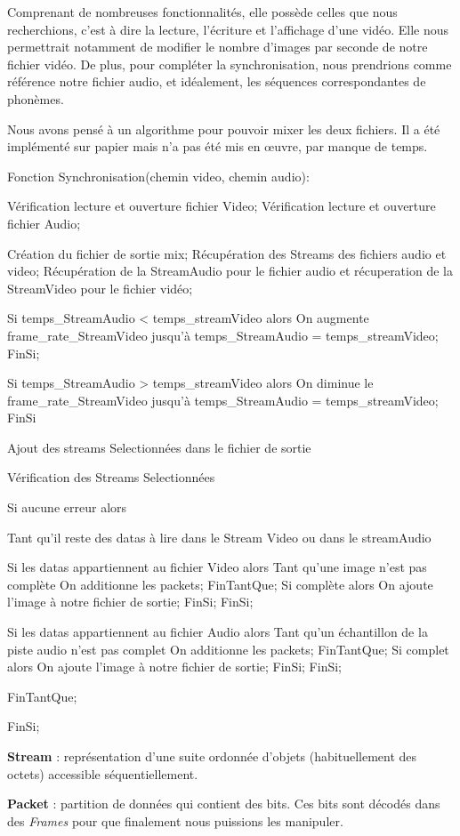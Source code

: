 Comprenant de nombreuses fonctionnalités, elle possède celles que nous recherchions, c'est à dire la lecture, l'écriture et l'affichage d’une vidéo. Elle nous permettrait notamment de modifier le nombre d'images par seconde de notre fichier vidéo. De plus, pour compléter la synchronisation, nous prendrions comme référence notre fichier audio, et idéalement, les séquences correspondantes de phonèmes.

Nous avons pensé à un algorithme pour pouvoir mixer les deux fichiers. Il a été implémenté sur papier mais n'a pas été mis en œuvre, par manque de temps.

\begin{verbnobox}[\small]

Fonction Synchronisation(chemin video, chemin audio):

Vérification lecture et ouverture fichier Video;
Vérification lecture et ouverture  fichier Audio;

Création du fichier de sortie mix;
Récupération des Streams des fichiers audio et video;
Récupération de la StreamAudio pour le fichier audio et récuperation de la StreamVideo pour le fichier vidéo;

Si temps_StreamAudio < temps_streamVideo alors
  On augmente frame_rate_StreamVideo jusqu'à temps_StreamAudio = temps_streamVideo;
FinSi;

Si temps_StreamAudio > temps_streamVideo alors
  On diminue le  frame_rate_StreamVideo jusqu'à temps_StreamAudio = temps_streamVideo;
FinSi

Ajout des streams Selectionnées dans le fichier de sortie

Vérification des Streams Selectionnées

Si aucune erreur alors 

  Tant qu'il reste des datas à lire dans le Stream Video ou dans le streamAudio

    Si les datas appartiennent au fichier Video alors
      Tant qu'une image n'est pas complète
	On additionne les packets;
      FinTantQue;
      Si complète alors
	On ajoute l'image à notre fichier de sortie;
      FinSi;
    FinSi;


    Si les datas appartiennent au fichier Audio alors
      Tant qu'un échantillon de la piste audio n'est pas complet
	On additionne les packets;
      FinTantQue;
      Si complet alors
	On ajoute l'image à notre fichier de sortie;
      FinSi;
    FinSi;
    
  FinTantQue;
  
FinSi;

\end{verbnobox}

\textbf{Stream} : représentation d'une suite ordonnée d'objets (habituellement des octets) accessible séquentiellement.


\textbf{Packet} : partition de données qui contient des bits. Ces bits sont décodés dans des \textit{Frames} pour que finalement nous puissions les manipuler.
